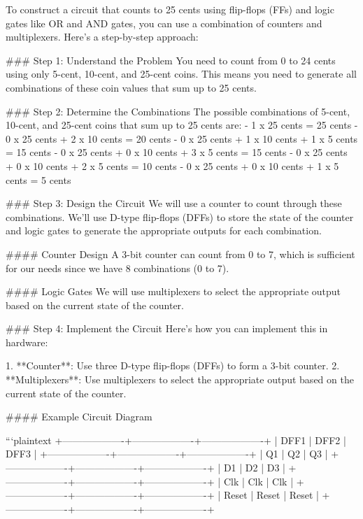 To construct a circuit that counts to 25 cents using flip-flops (FFs) and logic gates like OR and AND gates, you can use a combination of counters and multiplexers. Here's a step-by-step approach:

### Step 1: Understand the Problem
You need to count from 0 to 24 cents using only 5-cent, 10-cent, and 25-cent coins. This means you need to generate all combinations of these coin values that sum up to 25 cents.

### Step 2: Determine the Combinations
The possible combinations of 5-cent, 10-cent, and 25-cent coins that sum up to 25 cents are:
- 1 x 25 cents = 25 cents
- 0 x 25 cents + 2 x 10 cents = 20 cents
- 0 x 25 cents + 1 x 10 cents + 1 x 5 cents = 15 cents
- 0 x 25 cents + 0 x 10 cents + 3 x 5 cents = 15 cents
- 0 x 25 cents + 0 x 10 cents + 2 x 5 cents = 10 cents
- 0 x 25 cents + 0 x 10 cents + 1 x 5 cents = 5 cents

### Step 3: Design the Circuit
We will use a counter to count through these combinations. We'll use D-type flip-flops (DFFs) to store the state of the counter and logic gates to generate the appropriate outputs for each combination.

#### Counter Design
A 3-bit counter can count from 0 to 7, which is sufficient for our needs since we have 8 combinations (0 to 7).

#### Logic Gates
We will use multiplexers to select the appropriate output based on the current state of the counter.

### Step 4: Implement the Circuit
Here’s how you can implement this in hardware:

1. **Counter**: Use three D-type flip-flops (DFFs) to form a 3-bit counter.
2. **Multiplexers**: Use multiplexers to select the appropriate output based on the current state of the counter.

#### Example Circuit Diagram

```plaintext
+-------------------+-------------------+-------------------+
|       DFF1        |       DFF2        |       DFF3        |
+-------------------+-------------------+-------------------+
|       Q1          |       Q2          |       Q3          |
+-------------------+-------------------+-------------------+
|       D1          |       D2          |       D3          |
+-------------------+-------------------+-------------------+
|       Clk         |       Clk         |       Clk         |
+-------------------+-------------------+-------------------+
|       Reset       |       Reset       |       Reset       |
+-------------------+-------------------+-------------------+

